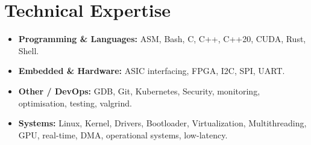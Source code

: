 \documentclass[9pt,a4paper]{article}
\begin{document}
\section*{Technical Expertise}
\begin{tcolorbox}[mybox]
\begin{itemize}
\item \textbf{Programming \& Languages:} ASM, Bash, C, C++, C++20, CUDA, Rust, Shell.

\item \textbf{Embedded \& Hardware:} ASIC interfacing, FPGA, I2C, SPI, UART.

\item \textbf{Other / DevOps:} GDB, Git, Kubernetes, Security, monitoring, optimisation, testing, valgrind.

\item \textbf{Systems:} Linux, Kernel, Drivers, Bootloader, Virtualization, Multithreading, GPU, real-time, DMA, operational systems, low-latency.
\end{itemize}
\end{tcolorbox}
\end{document}
